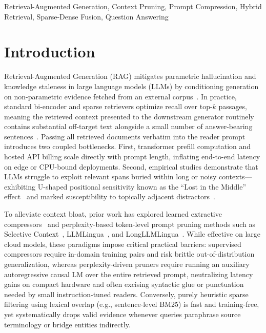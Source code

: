 \documentclass[conference]{IEEEtran}
\begin{document}
\begin{IEEEkeywords}
Retrieval-Augmented Generation, Context Pruning, Prompt Compression, Hybrid Retrieval, Sparse-Dense Fusion, Question Answering
\end{IEEEkeywords}

\section{Introduction}

Retrieval-Augmented Generation (RAG) mitigates parametric hallucination and knowledge staleness in large language models (LLMs) by conditioning generation on non-parametric evidence fetched from an external corpus~\cite{lewis2020rag,karpukhin2020dpr}. In practice, standard bi-encoder and sparse retrievers optimize recall over top-$k$ passages, meaning the retrieved context presented to the downstream generator routinely contains substantial off-target text alongside a small number of answer-bearing sentences~\cite{cuconasu2024noise}. Passing all retrieved documents verbatim into the reader prompt introduces two coupled bottlenecks. First, transformer prefill computation and hosted API billing scale directly with prompt length, inflating end-to-end latency on edge or CPU-bound deployments. Second, empirical studies demonstrate that LLMs struggle to exploit relevant spans buried within long or noisy contexts---exhibiting U-shaped positional sensitivity known as the ``Lost in the Middle'' effect~\cite{liu2024lost} and marked susceptibility to topically adjacent distractors~\cite{shi2023distracted}.

To alleviate context bloat, prior work has explored learned extractive compressors~\cite{xu2024recomp,wang2023filco} and perplexity-based token-level prompt pruning methods such as Selective Context~\cite{li2023selective}, LLMLingua~\cite{jiang2023llmlingua}, and LongLLMLingua~\cite{jiang2024longllmlingua}. While effective on large cloud models, these paradigms impose critical practical barriers: supervised compressors require in-domain training pairs and risk brittle out-of-distribution generalization, whereas perplexity-driven pruners require running an auxiliary autoregressive causal LM over the entire retrieved prompt, neutralizing latency gains on compact hardware and often excising syntactic glue or punctuation needed by small instruction-tuned readers. Conversely, purely heuristic sparse filtering using lexical overlap (e.g., sentence-level BM25) is fast and training-free, yet systematically drops valid evidence whenever queries paraphrase source terminology or bridge entities indirectly.
\end{document}
